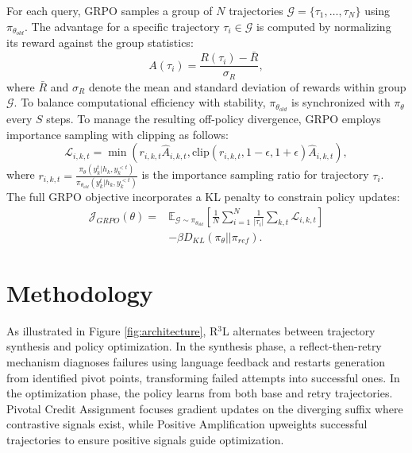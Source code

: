 \documentclass{article} %
\theoremstyle{definition}
\theoremstyle{remark}
\begin{document}
For each query, GRPO samples a group of $N$ trajectories $\mathcal{G} = \{\tau_1, \ldots, \tau_N\}$ using $\pi_{\theta_{old}}$. The advantage for a specific trajectory $\tau_i \in \mathcal{G}$ is computed by normalizing its reward against the group statistics:
\begin{equation}
    A(\tau_i) = \frac{R(\tau_i) - \bar{R}}{\sigma_R},
    \label{eq:grpo_advantage}
\end{equation}
where $\bar{R}$ and $\sigma_R$ denote the mean and standard deviation of rewards within group $\mathcal{G}$.
To balance computational efficiency with stability, $\pi_{\theta_{old}}$ is synchronized with $\pi_{\theta}$ every $S$ steps. To manage the resulting off-policy divergence, GRPO employs importance sampling with clipping as follows:
\begin{equation}
    \mathcal{L}_{i,k,t}\!\! =\!\! \min\! \! \left( \! r_{i,k,t} \hat{A}_{i,k,t},\! \text{clip}(r_{i,k,t}, \! 1 \!\!- \!\epsilon, \! 1 \!+\!\epsilon) \hat{A}_{i,k,t} \! \right)\!,
\end{equation}
where $r_{i,k,t} = \frac{\pi_{\theta}(y_k^t | h_k, y_k^{<t})}{\pi_{\theta_{old}}(y_k^t | h_k, y_k^{<t})}$ is the importance sampling ratio for trajectory $\tau_i$. The full GRPO objective incorporates a KL penalty to constrain policy updates:
\begin{equation}
\begin{split}
    \mathcal{J}_{GRPO}(\theta) = &\mathbb{E}_{\mathcal{G} \sim \pi_{\theta_{old}}} \left[ \frac{1}{N} \sum_{i=1}^N \frac{1}{|\tau_i|} \sum_{k,t} \mathcal{L}_{i,k,t} \right] \\
    &- \beta D_{KL}(\pi_{\theta} || \pi_{ref}).
\end{split}
\label{eq:grpo_full}
\end{equation}

\section{Methodology}

As illustrated in Figure \ref{fig:architecture}, R$^3$L alternates between trajectory synthesis and policy optimization. In the synthesis phase, a reflect-then-retry mechanism diagnoses failures using language feedback and restarts generation from identified pivot points, transforming failed attempts into successful ones. In the optimization phase, the policy learns from both base and retry trajectories. Pivotal Credit Assignment focuses gradient updates on the diverging suffix where contrastive signals exist, while Positive Amplification upweights successful trajectories to ensure positive signals guide optimization.
\end{document}
